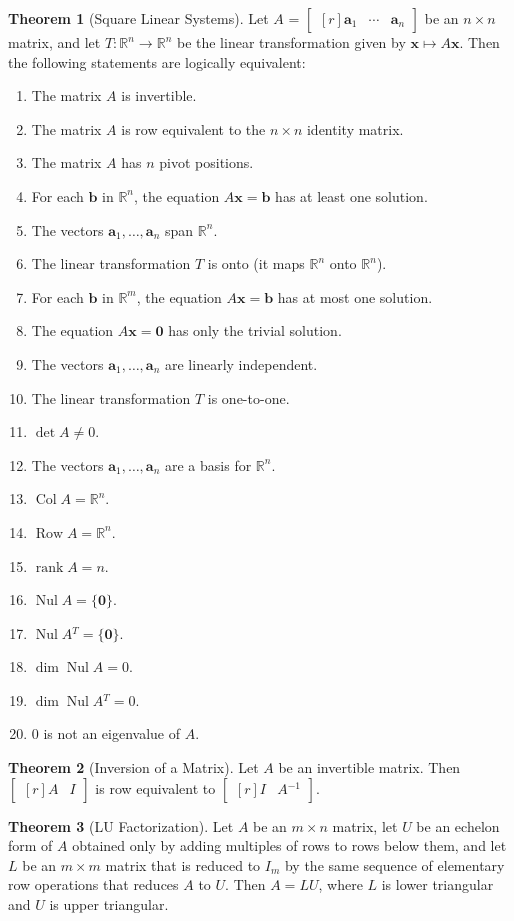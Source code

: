 \documentclass{myart}
\renewcommand{\vec}[1]{\ensuremath{\mathbf{#1}}} %
\newcommand{\mat}[1]{\ensuremath{#1}} %
\newcommand{\R}[1][]{\ensuremath{\mathbb{R}^{#1}}} %
\newcommand{\by}{\ensuremath{\times}} %
\newcommand{\MAT}[2][r]{\ensuremath{\begin{bmatrix*}[#1]#2\end{bmatrix*}}} %
\newcommand{\set}[1]{\ensuremath{\{#1\}}} %
\newcommand{\inv}{\ensuremath{^{-1}}} %
\newcommand{\trans}{\ensuremath{^T}} %
\DeclareMathOperator{\Nul}{Nul} %
\DeclareMathOperator{\Col}{Col} %
\DeclareMathOperator{\Row}{Row} %
\DeclareMathOperator{\rank}{rank} %
\newcommand{\many}[2][n]{\ensuremath{{#2}_1, \ldots, {#2}_{#1}}} %
\theoremstyle{definition}
\newtheorem{thm}{Theorem}
\begin{document}
\begin{thm}[Square Linear Systems]
Let \mat A = \MAT{\vec a_1 & \cdots & \vec a_n} be an $n \by n$ matrix, and let $T : \R[n] \to \R[n]$ be the linear transformation given by $\vec x \mapsto \mat A\vec x$. Then the following statements are logically equivalent:
\begin{enumerate}
\item The matrix \mat A is invertible.
\item The matrix \mat A is row equivalent to the $n \by n$ identity matrix.
\item The matrix \mat A has $n$ pivot positions.
\item For each \vec b in \R[n], the equation $\mat A\vec x = \vec b$ has at least one solution.
\item The vectors \many{\vec a} span \R[n].
\item The linear transformation $T$ is onto (it maps \R[n] onto \R[n]).
\item For each \vec b in \R[m], the equation $\mat A\vec x = \vec b$ has at most one solution.
\item The equation $\mat A\vec x = \vec 0$ has only the trivial solution.
\item The vectors \many{\vec a} are linearly independent.
\item The linear transformation $T$ is one-to-one.
\item $\det \mat A \neq 0$.
\item The vectors \many{\vec a} are a basis for \R[n].
\item $\Col \mat A = \R[n]$.
\item $\Row \mat A = \R[n]$.
\item $\rank \mat A = n$.
\item $\Nul \mat A = \set{\vec 0}$.
\item $\Nul \mat A\trans = \set{\vec 0}$.
\item $\dim \Nul \mat A = 0$.
\item $\dim \Nul \mat A\trans = 0$.
\item $0$ is not an eigenvalue of \mat A.
\end{enumerate}
\end{thm}

\begin{thm}[Inversion of a Matrix]
Let \mat A be an invertible matrix. Then \MAT{\mat A & \mat I} is row equivalent to \MAT{\mat I & \mat A\inv}.
\end{thm}

\begin{thm}[LU Factorization]
Let \mat A be an $m \by n$ matrix, let \mat U be an echelon form of \mat A obtained only by adding multiples of rows to rows below them, and let \mat L be an $m \by m$ matrix that is reduced to $\mat I_m$ by the same sequence of elementary row operations that reduces \mat A to \mat U. Then $\mat A = \mat L \mat U$, where \mat L is lower triangular and \mat U is upper triangular.
\end{thm}
\end{document}
